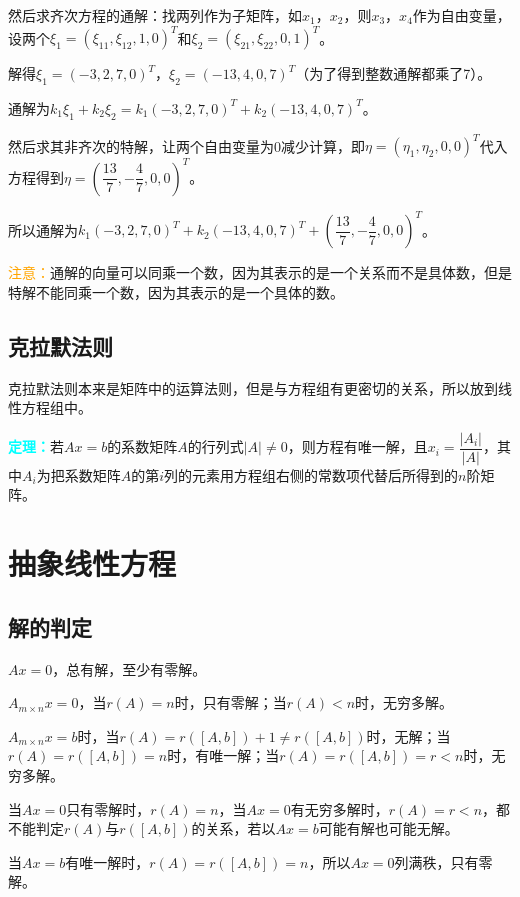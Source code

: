然后求齐次方程的通解：找两列作为子矩阵，如$x_1$，$x_2$，则$x_3$，$x_4$作为自由变量，设两个$\xi_1=(\xi_{11},\xi_{12},1,0)^T$和$\xi_2=(\xi_{21},\xi_{22},0,1)^T$。

解得$\xi_1=(-3,2,7,0)^T$，$\xi_2=(-13,4,0,7)^T$（为了得到整数通解都乘了7）。

通解为$k_1\xi_1+k_2\xi_2=k_1(-3,2,7,0)^T+k_2(-13,4,0,7)^T$。

然后求其非齐次的特解，让两个自由变量为0减少计算，即$\eta=(\eta_1,\eta_2,0,0)^T$代入方程得到$\eta=\left(\dfrac{13}{7},-\dfrac{4}{7},0,0\right)^T$。

所以通解为$k_1(-3,2,7,0)^T+k_2(-13,4,0,7)^T+\left(\dfrac{13}{7},-\dfrac{4}{7},0,0\right)^T$。

\textcolor{orange}{注意：}通解的向量可以同乘一个数，因为其表示的是一个关系而不是具体数，但是特解不能同乘一个数，因为其表示的是一个具体的数。

\subsection{克拉默法则}

克拉默法则本来是矩阵中的运算法则，但是与方程组有更密切的关系，所以放到线性方程组中。

\textcolor{aqua}{\textbf{定理：}}若$Ax=b$的系数矩阵$A$的行列式$\vert A\vert\neq0$，则方程有唯一解，且$x_i=\dfrac{\vert A_i\vert}{\vert A\vert}$，其中$A_i$为把系数矩阵$A$的第$i$列的元素用方程组右侧的常数项代替后所得到的$n$阶矩阵。

\section{抽象线性方程}

\subsection{解的判定}

$Ax=0$，总有解，至少有零解。

$A_{m\times n}x=0$，当$r(A)=n$时，只有零解；当$r(A)<n$时，无穷多解。

$A_{m\times n}x=b$时，当$r(A)=r([A,b])+1\neq r([A,b])$时，无解；当$r(A)=r([A,b])=n$时，有唯一解；当$r(A)=r([A,b])=r<n$时，无穷多解。

当$Ax=0$只有零解时，$r(A)=n$，当$Ax=0$有无穷多解时，$r(A)=r<n$，都不能判定$r(A)$与$r([A,b])$的关系，若以$Ax=b$可能有解也可能无解。

当$Ax=b$有唯一解时，$r(A)=r([A,b])=n$，所以$Ax=0$列满秩，只有零解。

